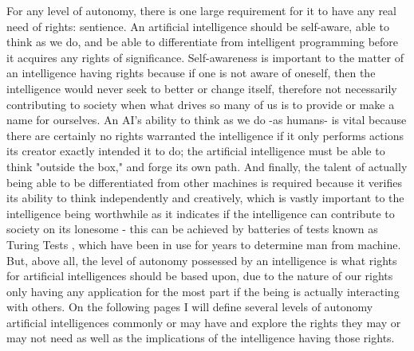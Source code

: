 For any level of autonomy, there is one large requirement for it to have any real need of rights: sentience. An artificial intelligence should be self-aware, able to think as we do, and be able to differentiate from intelligent programming before it acquires any rights of significance. Self-awareness is important to the matter of an intelligence having rights because if one is not aware of oneself, then the intelligence would never seek to better or change itself, therefore not necessarily contributing to society when what drives so many of us is to provide or make a name for ourselves. An AI's ability to think as we do -as humans- is vital because there are certainly no rights warranted the intelligence if it only performs actions its creator exactly intended it to do; the artificial intelligence must be able to think "outside the box," and forge its own path. And finally, the talent of actually being able to be differentiated from other machines is required because it verifies its ability to think independently and creatively, which is vastly important to the intelligence being worthwhile as it indicates if the intelligence can contribute to society on its lonesome - this can be achieved by batteries of tests known as Turing Tests \cite{sep-turing-test}, which have been in use for years to determine man from machine. But, above all, the level of autonomy possessed by an intelligence is what rights for artificial intelligences should be based upon, due to the nature of our rights only having any application for the most part if the being is actually interacting with others. On the following pages I will define several levels of autonomy artificial intelligences commonly or may have and explore the rights they may or may not need as well as the implications of the intelligence having those rights.